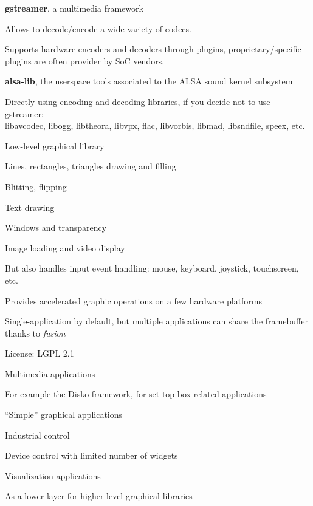   \startitemize
  \item {\bf gstreamer}, a multimedia framework
    \startitemize
    \item Allows to decode/encode a wide variety of codecs.
    \item Supports hardware encoders and decoders through plugins,
      proprietary/specific plugins are often provider by SoC vendors.
    \stopitemize
  \item {\bf alsa-lib}, the userspace tools associated to the ALSA sound
    kernel subsystem
  \item Directly using encoding and decoding libraries, if you decide
    not to use gstreamer:\\
    libavcodec, libogg, libtheora, libvpx, flac, libvorbis, libmad,
    libsndfile, speex, etc.
  \stopitemize

  \startitemize
  \item Low-level graphical library
    \startitemize
    \item Lines, rectangles, triangles drawing and filling
    \item Blitting, flipping
    \item Text drawing
    \item Windows and transparency
    \item Image loading and video display
    \stopitemize
  \item But also handles input event handling: mouse, keyboard, joystick,
    touchscreen, etc.
  \item Provides accelerated graphic operations on a few hardware
    platforms
  \item Single-application by default, but multiple applications can
    share the framebuffer thanks to {\em fusion}
  \item License: LGPL 2.1
  \item {}
  \stopitemize


  \startitemize
  \item Multimedia applications
    \startitemize
    \item For example the Disko framework, for set-top box related
      applications
    \stopitemize
  \item ``Simple'' graphical applications
    \startitemize
    \item Industrial control
    \item Device control with limited number of widgets
    \stopitemize
  \item Visualization applications
  \item As a lower layer for higher-level graphical libraries
  \stopitemize

